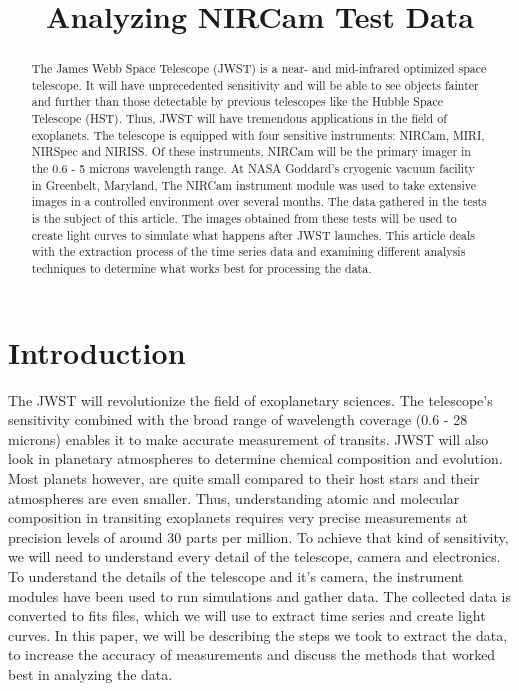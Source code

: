 \documentclass[conference]{IEEEtran}
\begin{document}
\title{Analyzing NIRCam Test Data}
\author
{
}
\maketitle



\begin{abstract}
The James Webb Space Telescope (JWST) is a near- and mid-infrared optimized space telescope. It will have unprecedented sensitivity and will be able to see objects fainter and further than those detectable by previous telescopes like the Hubble Space Telescope (HST). Thus, JWST will have tremendous applications in the field of exoplanets. The telescope is equipped with four sensitive instruments: NIRCam, MIRI, NIRSpec and NIRISS. Of these instruments, NIRCam will be the primary imager in the 0.6 - 5 microns wavelength range. At NASA Goddard’s cryogenic vacuum facility in Greenbelt, Maryland, The NIRCam instrument module was used to take extensive images in a controlled environment over several months. The data gathered in the tests is the subject of this article. The images obtained from these tests will be used to create light curves to simulate what happens after JWST launches. This article deals with the extraction process of the time series data and examining different analysis techniques to determine what works best for processing the data.
\end{abstract}



\section{Introduction}
The JWST will revolutionize the field of exoplanetary sciences. The telescope's sensitivity combined with the broad range of wavelength coverage (0.6 - 28 microns) enables it to make accurate measurement of transits. JWST will also look in planetary atmospheres to determine chemical composition and evolution. Most planets however, are quite small compared to their host stars and their atmospheres are even smaller. Thus, understanding atomic and molecular composition in transiting exoplanets requires very precise measurements at precision levels of around 30 parts per million. To achieve that kind of sensitivity, we will need to understand every detail of the telescope, camera and electronics.\\
To understand the details of the telescope and it's camera, the instrument modules have been used to run simulations and gather data. The collected data is converted to fits files, which we will use to extract time series and create light curves. In this paper, we will be describing the steps we took to extract the data, to increase the accuracy of measurements and discuss the methods that worked best in analyzing the data.   
\end{document}
